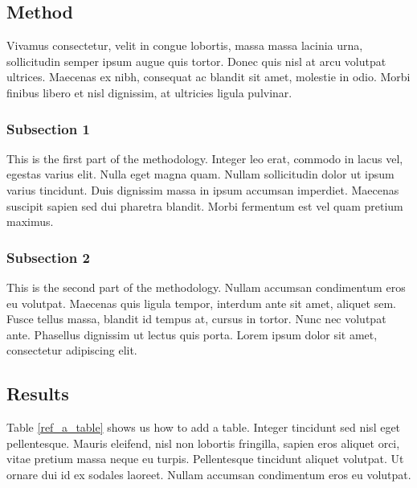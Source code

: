 \hypertarget{method-1}{%
\subsection{Method}\label{method-1}}

Vivamus consectetur, velit in congue lobortis, massa massa lacinia
urna, sollicitudin semper ipsum augue quis tortor. Donec quis nisl
at arcu volutpat ultrices. Maecenas ex nibh, consequat ac blandit
sit amet, molestie in odio. Morbi finibus libero et nisl dignissim,
at ultricies ligula pulvinar.

\hypertarget{subsection-1-1}{%
\subsubsection{Subsection 1}\label{subsection-1-1}}

This is the first part of the methodology. Integer leo erat, commodo
in lacus vel, egestas varius elit. Nulla eget magna quam. Nullam
sollicitudin dolor ut ipsum varius tincidunt. Duis dignissim massa
in ipsum accumsan imperdiet. Maecenas suscipit sapien sed dui
pharetra blandit. Morbi fermentum est vel quam pretium maximus.

\hypertarget{subsection-2-2}{%
\subsubsection{Subsection 2}\label{subsection-2-2}}

This is the second part of the methodology. Nullam accumsan
condimentum eros eu volutpat. Maecenas quis ligula tempor, interdum
ante sit amet, aliquet sem. Fusce tellus massa, blandit id tempus
at, cursus in tortor. Nunc nec volutpat ante. Phasellus dignissim ut
lectus quis porta. Lorem ipsum dolor sit amet, consectetur
adipiscing elit.

\hypertarget{results-2}{%
\subsection{Results}\label{results-2}}

Table \ref{ref_a_table} shows us how to add a table. Integer
tincidunt sed nisl eget pellentesque. Mauris eleifend, nisl non
lobortis fringilla, sapien eros aliquet orci, vitae pretium massa
neque eu turpis. Pellentesque tincidunt aliquet volutpat. Ut ornare
dui id ex sodales laoreet. Nullam accumsan condimentum eros eu
volutpat.

